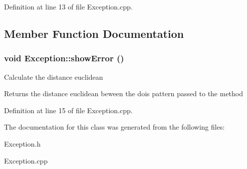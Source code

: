 Definition at line 13 of file Exception.cpp.

\subsection{Member Function Documentation}
\hypertarget{classException_aca2f9cfcfdfede80fc028a4150f0af48}{
\subsubsection[{showError}]{\setlength{\rightskip}{0pt plus 5cm}void Exception::showError ()}}
\label{classException_aca2f9cfcfdfede80fc028a4150f0af48}
Calculate the distance euclidean \begin{DoxyReturn}{Returns}
the distance euclidean beween the dois pattern passed to the method 
\end{DoxyReturn}


Definition at line 15 of file Exception.cpp.

The documentation for this class was generated from the following files:\begin{DoxyCompactItemize}
\item 
Exception.h\item 
Exception.cpp\end{DoxyCompactItemize}
